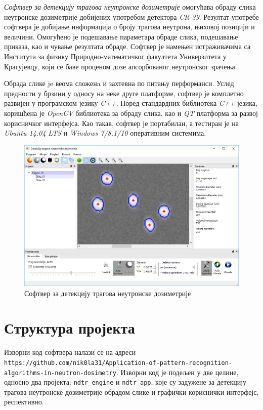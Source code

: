 \documentclass[11pt,a4paper,serbian,oneside]{book}
\begin{document}
\textit{Софтвер за детекцију трагова неутронске дозиметрије} омогућава обраду слика не\-у\-трон\-ске дозиметрије добијених употребом детектора \textit{CR-39}. Резултат употребе софтвера је добијање информација о броју трагова неутрона, њиховој позицији и величини. Омогућено је подешавање параметара обраде слика, подешавање приказа, као и чување резултата обраде. Софтвер је намењен истраживачима са Института за физику Природно-мате\-ма\-ти\-чког факултета Универзитета у Крагујевцу, који се баве проценом дозе апсорбованог неутронског зрачења.

Обрада слике je веома сложенa и захтевна по питању перформанси. Услед предности у брзини у односу на неке друге платформе, софтвер је комплетно развијен у програмском језику \textit{C++}. Поред стандардних библиотека \textit{C++} језика, коришћена је \textit{OpenCV} библиотека за обраду слика, као и \textit{QT} платформа за развој корисничког интерфејса. Као такав, софтвер је портабилан, а тестиран је на \textit{Ubuntu 14.04 LTS} и \textit{Windows 7/8.1/10} оперативним системима.

\begin{figure}[H]
\begin{center}
\includegraphics[width=135mm]{images/softver.png}
\end{center}
\caption{Софтвер за детекцију трагова неутронске дозиметрије}
\label{fig:softver}
\end{figure}

\section{Структура пројекта}
Изворни код софтвера налази се на адреси \texttt{https://github.com/nik0la31/Application-of-pattern-recognition-algorithms-in-neutron-dosimetry}. Изворни код је подељен у две целине, односно два пројекта: \texttt{ndtr\_engine} и \texttt{ndtr\_app}, које су задужене за детекцију трагова неутронске до\-зи\-ме\-три\-је обрадом слике и графички кориснички интерфејс, респективно.
\end{document}

